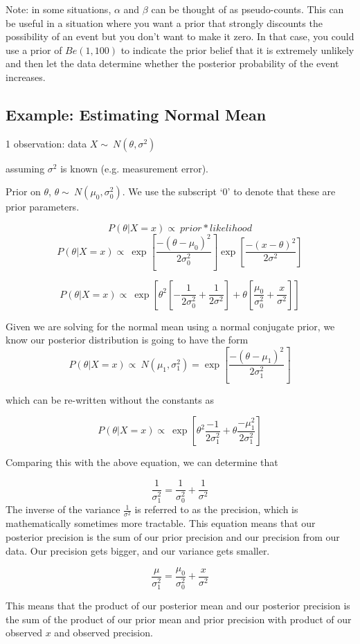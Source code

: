 \documentclass[12pt]{report}
\begin{document}
Note: in some situations, $\alpha$ and $\beta$ can be thought of as pseudo-counts. This can be useful in a situation where you want a prior that strongly discounts the possibility of an event but you don't want to make it zero. In that case, you could use a prior of $Be(1,100)$ to indicate the prior belief that it is extremely unlikely and then let the data determine whether the posterior probability of the event increases.

\subsection{Example: Estimating Normal Mean}

1 observation: data $X \sim\ N(\theta,\sigma^2)$

assuming $\sigma^2$ is known (e.g. measurement error).

Prior on $\theta$, $\theta \sim\ N(\mu_0,\sigma_0^2)$. We use the subscript `0' to denote that these are prior parameters.

\[
P(\theta|X=x) \propto\ prior * likelihood
\]
\[
P(\theta|X=x) \propto\ \exp{[\frac{-(\theta - \mu_0)^2}{2 \sigma_0^2}]} \exp{[\frac{-(x - \theta)^2}{2 \sigma^2}]}
\]


\[
P(\theta|X=x) \propto\ \exp{[\theta^2 [-\frac{1}{2\sigma_0^2}+\frac{1}{2\sigma^2}] + \theta[\frac{\mu_0}{\sigma_0^2}+\frac{x}{\sigma^2}]]}
\]

Given we are solving for the normal mean using a normal conjugate prior, we know our posterior distribution is going to have the form
\[
P(\theta|X=x) \propto\ N(\mu_1,\sigma_1^2) = \exp{[\frac{-(\theta - \mu_1)^2}{2 \sigma_1^2}]}
\]

which can be re-written without the constants as

\[
P(\theta|X=x) \propto\  \exp{[\theta^2\frac{-1}{2 \sigma_1^2}+\theta \frac{-\mu_1^2}{2 \sigma_1^2}]}
\]




Comparing this with the above equation, we can determine that

\[
\frac{1}{\sigma_1^2} = \frac{1}{\sigma_0^2} + \frac{1}{\sigma^2}
\]
The inverse of the variance $\frac{1}{\sigma^2}$ is referred to as the precision, which is mathematically sometimes more tractable. This equation means that our posterior precision is the sum of our prior precision and our precision from our data. Our precision gets bigger, and our variance gets smaller.

\[
\frac{\mu}{\sigma_1^2} = \frac{\mu_0}{\sigma_0^2} + \frac{x}{\sigma^2}
\]

This means that the product of our posterior mean and our posterior precision is the sum of the product of our prior mean and prior precision with product of our observed $x$ and observed precision.
\end{document}
